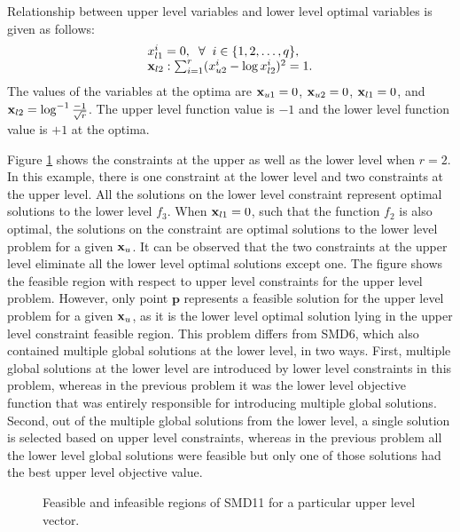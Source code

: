 \documentclass[twoside]{article}
\begin{document}
Relationship between upper level variables and lower level optimal variables is given as follows:
\begin{equation}
\begin{array}{l}
x_{l1}^{i} = 0, \hspace{2mm} \forall \hspace{2mm} i \in \{1,2,\ldots,q\},\\
\mbox{$\mathbf{x}$}_{l2} : \sum_{i=1}^{r} (x_{u2}^{i} - \log x_{l2}^{i})^2 = 1.
\end{array}
\end{equation}
The values of the variables at the optima are $\mbox{$\mathbf{x}$}_{u1}=0$, $\mbox{$\mathbf{x}$}_{u2}=0$, $\mbox{$\mathbf{x}$}_{l1}=0$, and $\mbox{$\mathbf{x}$}_{l2}=\log^{-1}\frac{-1}{\sqrt{r}}$. The upper level function value is $-1$ and the
lower level function value is $+1$ at the optima.

Figure \ref{fig:smd11} shows the constraints at the upper as well as the lower level when $r=2$. In this example, there is one constraint at the lower level and two constraints at the upper level. All the solutions on the lower level constraint represent optimal solutions to the lower level $f_3$. When $\mbox{$\mathbf{x}$}_{l1}=0$, such that the function $f_2$ is also optimal, the solutions on the constraint are optimal solutions to the lower level problem  for a given $\mbox{$\mathbf{x}$}_u$. It can be observed that the two constraints at the upper level eliminate all the lower level optimal solutions except one. The figure shows the feasible region with respect to upper level constraints for the upper level problem. However, only point $\mathbf{p}$ represents a feasible solution for the upper level problem for a given $\mbox{$\mathbf{x}$}_u$, as it is the lower level optimal solution lying in the upper level constraint feasible region. This problem differs from SMD6, which also contained multiple global solutions at the lower level, in two ways. First, multiple global solutions at the lower level are introduced by lower level constraints in this problem, whereas in the previous problem it was the lower level objective function that was entirely responsible for introducing multiple global solutions. Second, out of the multiple global solutions from the lower level, a single solution is selected based on upper level constraints, whereas in the previous problem all the lower level global solutions were feasible but only one of those solutions had the best upper level objective value.

\begin{figure}
\begin{center}
\caption{Feasible and infeasible regions of SMD11 for a particular upper level vector.}
\label{fig:smd11}
\end{center}
\end{figure}
\end{document}
